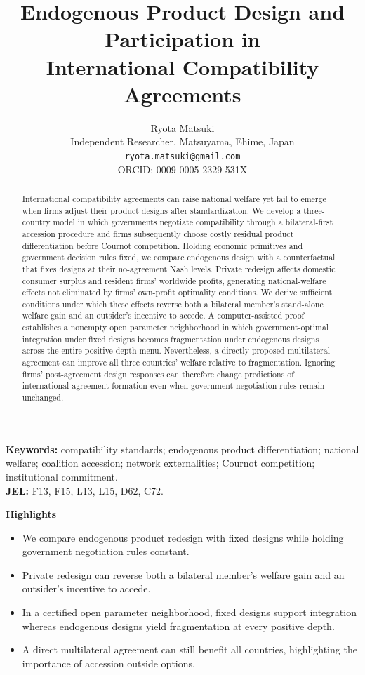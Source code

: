 \documentclass[11pt,a4paper]{article}
\title{Endogenous Product Design and Participation in\\ International Compatibility Agreements}
\author{Ryota Matsuki\\Independent Researcher, Matsuyama, Ehime, Japan\\\texttt{ryota.matsuki@gmail.com}\\ORCID: 0009-0005-2329-531X}
\date{}
\theoremstyle{remark}\newtheorem{remark}[theorem]{Remark}
\begin{document}
\maketitle
\begin{abstract}
International compatibility agreements can raise national welfare yet fail to emerge when firms adjust their product designs after standardization. We develop a three-country model in which governments negotiate compatibility through a bilateral-first accession procedure and firms subsequently choose costly residual product differentiation before Cournot competition. Holding economic primitives and government decision rules fixed, we compare endogenous design with a counterfactual that fixes designs at their no-agreement Nash levels. Private redesign affects domestic consumer surplus and resident firms' worldwide profits, generating national-welfare effects not eliminated by firms' own-profit optimality conditions. We derive sufficient conditions under which these effects reverse both a bilateral member's stand-alone welfare gain and an outsider's incentive to accede. A computer-assisted proof establishes a nonempty open parameter neighborhood in which government-optimal integration under fixed designs becomes fragmentation under endogenous designs across the entire positive-depth menu. Nevertheless, a directly proposed multilateral agreement can improve all three countries' welfare relative to fragmentation. Ignoring firms' post-agreement design responses can therefore change predictions of international agreement formation even when government negotiation rules remain unchanged.
\end{abstract}
\noindent\textbf{Keywords:} compatibility standards; endogenous product differentiation; national welfare; coalition accession; network externalities; Cournot competition; institutional commitment.\\
\textbf{JEL:} F13, F15, L13, L15, D62, C72.

\noindent\textbf{Highlights}
\begin{itemize}
\setlength{\itemsep}{0pt}
\item We compare endogenous product redesign with fixed designs while holding government negotiation rules constant.
\item Private redesign can reverse both a bilateral member's welfare gain and an outsider's incentive to accede.
\item In a certified open parameter neighborhood, fixed designs support integration whereas endogenous designs yield fragmentation at every positive depth.
\item A direct multilateral agreement can still benefit all countries, highlighting the importance of accession outside options.
\end{itemize}
\end{document}
